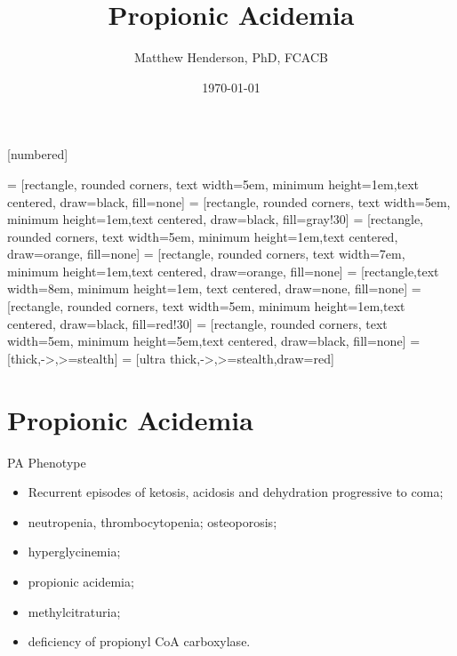 \documentclass[presentation, smaller]{beamer}
\author{Matthew Henderson, PhD, FCACB}
\date{\today}
\title{Propionic Acidemia}
\institute[NSO]{Newborn Screening Ontario | The University of Ottawa}
\begin{document}
\maketitle

\vspace{220pt}
\beamertemplatenavigationsymbolsempty
{}[numbered]

 = [rectangle, rounded corners, text width=5em, minimum height=1em,text centered, draw=black, fill=none]
 = [rectangle, rounded corners, text width=5em, minimum height=1em,text centered, draw=black, fill=gray!30]
 = [rectangle, rounded corners, text width=5em, minimum height=1em,text centered, draw=orange, fill=none]
 = [rectangle, rounded corners, text width=7em, minimum height=1em,text centered, draw=orange, fill=none]
 = [rectangle,text width=8em, minimum height=1em, text centered, draw=none, fill=none]
 = [rectangle, rounded corners, text width=5em, minimum height=1em,text centered, draw=black, fill=red!30]
 = [rectangle, rounded corners, text width=5em, minimum height=5em,text centered, draw=black, fill=none]
 = [thick,->,>=stealth]
 = [ultra thick,->,>=stealth,draw=red]

\section{Propionic Acidemia}
\label{sec:orgheadline13}
\begin{frame}[label={sec:orgheadline1}]{PA Phenotype}
\begin{itemize}
\item Recurrent episodes of ketosis, acidosis and dehydration progressive to coma;
\item neutropenia, thrombocytopenia; osteoporosis;
\item hyperglycinemia;
\item propionic acidemia;
\item methylcitraturia;
\item deficiency of propionyl CoA carboxylase.
\end{itemize}
\end{frame}
\end{document}
